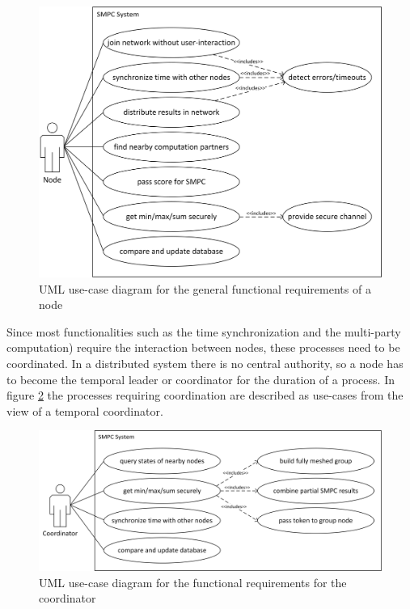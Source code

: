 \begin{figure}[!htb] %
	\caption[General functional requirements of a node]{\gls{UML} use-case diagram for the general functional requirements of a node} \label{figure:requirements use-case node}
	\includegraphics[scale=0.85]{figures/use-case-node.png}
\end{figure}

Since most functionalities such as the time synchronization and the multi-party computation) require the interaction between nodes, these processes need to be coordinated. In a distributed system there is no central authority, so a node has to become the temporal leader or coordinator for the duration of a process. In figure \ref{figure:requirements use-case coordinator} the processes requiring coordination are described as use-cases from the view of a temporal coordinator.

\begin{figure}[!htb] %
	\caption[Use-case diagram for coordinator requirements]{\gls{UML} use-case diagram for the functional requirements for the coordinator} \label{figure:requirements use-case coordinator}
	\includegraphics[scale=0.75]{figures/use-case-coordinator.png}
\end{figure}

